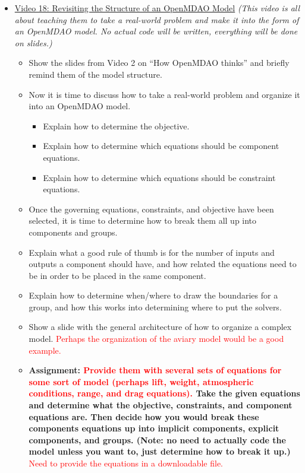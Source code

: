 \documentclass[12pt, letterpaper]{article}
\begin{document}
\begin{itemize}
	\item \underline{Video 18: Revisiting the Structure of an OpenMDAO Model} \textit{(This video is all about teaching them to take a real-world problem and make it into the form of an OpenMDAO model. No actual code will be written, everything will be done on slides.)}
		\begin{itemize}
			\item Show the slides from Video 2 on “How OpenMDAO thinks” and briefly remind them of the model structure.
			\item Now it is time to discuss how to take a real-world problem and organize it into an OpenMDAO model.
				\begin{itemize}
					\item Explain how to determine the objective.
					\item Explain how to determine which equations should be component equations.
					\item Explain how to determine which equations should be constraint equations.
				\end{itemize}
			\item Once the governing equations, constraints, and objective have been selected, it is time to determine how to break them all up into components and groups.
			\item Explain what a good rule of thumb is for the number of inputs and outputs a component should have, and how related the equations need to be in order to be placed in the same component.
			\item Explain how to determine when/where to draw the boundaries for a group, and how this works into determining where to put the solvers.
			\item Show a slide with the general architecture of how to organize a complex model. \textcolor{red}{Perhaps the organization of the aviary model would be a good example.}
			\item \textbf{Assignment: \textcolor{red}{Provide them with several sets of equations for some sort of model (perhaps lift, weight, atmospheric conditions, range, and drag equations).} Take the given equations and determine what the objective, constraints, and component equations are. Then decide how you would break these components equations up into implicit components, explicit components, and groups. (Note: no need to actually code the model unless you want to, just determine how to break it up.)} \textcolor{red}{Need to provide the equations in a downloadable file.}
		\end{itemize}	
		

\end{itemize}
\end{document}
